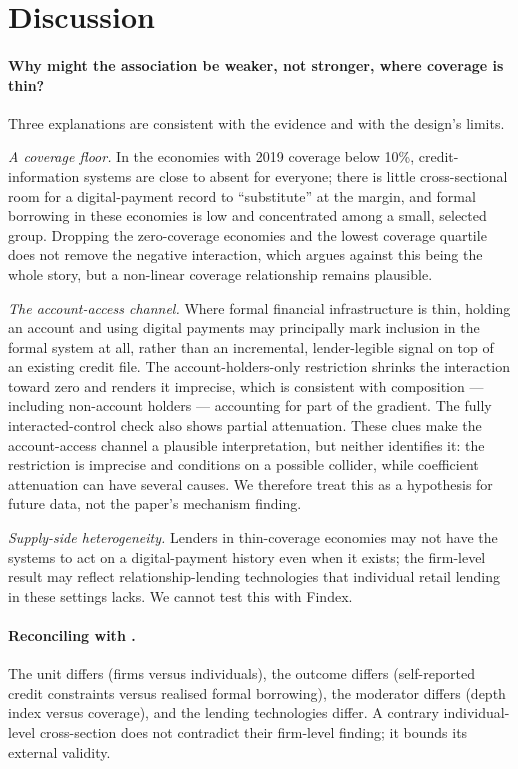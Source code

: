 \section{Discussion}

\paragraph{Why might the association be weaker, not stronger, where coverage is thin?} Three
explanations are consistent with the evidence and with the design's limits.

\emph{A coverage floor.} In the \ThinCoverageEconomies{} economies with 2019 coverage below
10\%, credit-information systems are close to absent for everyone; there is little
cross-sectional room for a digital-payment record to ``substitute'' at the margin, and
formal borrowing in these economies is low and concentrated among a small, selected group.
Dropping the zero-coverage economies and the lowest coverage quartile does not remove the
negative interaction, which argues against this being the whole story, but a non-linear
coverage relationship remains plausible.

\emph{The account-access channel.} Where formal financial infrastructure is thin, holding an
account and using digital payments may principally mark inclusion in the formal system at
all, rather than an incremental, lender-legible signal on top of an existing credit file.
The account-holders-only restriction shrinks the interaction toward zero and renders it
imprecise, which is consistent with composition --- including non-account holders ---
accounting for part of the gradient. The fully interacted-control check also shows partial
attenuation. These clues make the account-access channel a plausible interpretation, but
neither identifies it: the restriction is imprecise and conditions on a possible collider,
while coefficient attenuation can have several causes. We therefore treat this as a
hypothesis for future data, not the paper's mechanism finding.

\emph{Supply-side heterogeneity.} Lenders in thin-coverage economies may not have the
systems to act on a digital-payment history even when it exists; the firm-level result may
reflect relationship-lending technologies that individual retail lending in these settings
lacks. We cannot test this with Findex.

\paragraph{Reconciling with \citet{GalileaFaraziMare2026}.} The unit differs (firms versus
individuals), the outcome differs (self-reported credit constraints versus realised formal
borrowing), the moderator differs (depth index versus coverage), and the lending
technologies differ. A contrary individual-level cross-section does not contradict their
firm-level finding; it bounds its external validity.

